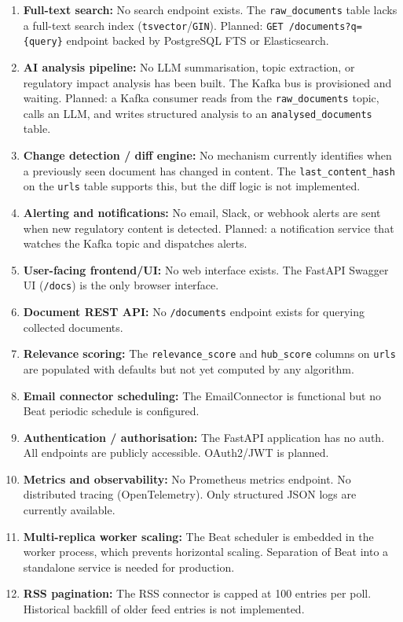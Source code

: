 \documentclass[12pt,a4paper]{article}
\begin{document}
\begin{warnbox}
\begin{enumerate}[noitemsep]
  \item \textbf{Full-text search:} No search endpoint exists. The \texttt{raw\_documents} table lacks a full-text search index (\texttt{tsvector}/\texttt{GIN}). Planned: \texttt{GET /documents?q=\{query\}} endpoint backed by PostgreSQL FTS or Elasticsearch.
  \item \textbf{AI analysis pipeline:} No LLM summarisation, topic extraction, or regulatory impact analysis has been built. The Kafka bus is provisioned and waiting. Planned: a Kafka consumer reads from the \texttt{raw\_documents} topic, calls an LLM, and writes structured analysis to an \texttt{analysed\_documents} table.
  \item \textbf{Change detection / diff engine:} No mechanism currently identifies when a previously seen document has changed in content. The \texttt{last\_content\_hash} on the \texttt{urls} table supports this, but the diff logic is not implemented.
  \item \textbf{Alerting and notifications:} No email, Slack, or webhook alerts are sent when new regulatory content is detected. Planned: a notification service that watches the Kafka topic and dispatches alerts.
  \item \textbf{User-facing frontend/UI:} No web interface exists. The FastAPI Swagger UI (\texttt{/docs}) is the only browser interface.
  \item \textbf{Document REST API:} No \texttt{/documents} endpoint exists for querying collected documents.
  \item \textbf{Relevance scoring:} The \texttt{relevance\_score} and \texttt{hub\_score} columns on \texttt{urls} are populated with defaults but not yet computed by any algorithm.
  \item \textbf{Email connector scheduling:} The EmailConnector is functional but no Beat periodic schedule is configured.
  \item \textbf{Authentication / authorisation:} The FastAPI application has no auth. All endpoints are publicly accessible. OAuth2/JWT is planned.
  \item \textbf{Metrics and observability:} No Prometheus metrics endpoint. No distributed tracing (OpenTelemetry). Only structured JSON logs are currently available.
  \item \textbf{Multi-replica worker scaling:} The Beat scheduler is embedded in the worker process, which prevents horizontal scaling. Separation of Beat into a standalone service is needed for production.
  \item \textbf{RSS pagination:} The RSS connector is capped at 100 entries per poll. Historical backfill of older feed entries is not implemented.
\end{enumerate}
\end{warnbox}
\end{document}
